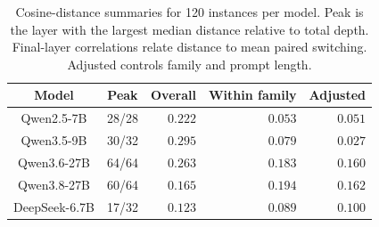 \begin{table}[!htbp]
\centering
\caption{Cosine-distance summaries for 120 instances per model. Peak is the layer with the largest median distance relative to total depth. Final-layer correlations relate distance to mean paired switching. Adjusted controls family and prompt length.}
\label{tab:representation-association}
\small
\setlength{\tabcolsep}{3pt}
\begin{tabular}{ccrrr}
\toprule
Model & Peak & Overall & Within family & Adjusted \\
\midrule
Qwen2.5-7B & 28/28 & $0.222$ & $0.053$ & $0.051$ \\
Qwen3.5-9B & 30/32 & $0.295$ & $0.079$ & $0.027$ \\
Qwen3.6-27B & 64/64 & $0.263$ & $0.183$ & $0.160$ \\
Qwen3.8-27B & 60/64 & $0.165$ & $0.194$ & $0.162$ \\
DeepSeek-6.7B & 17/32 & $0.123$ & $0.089$ & $0.100$ \\
\bottomrule
\end{tabular}
\end{table}
